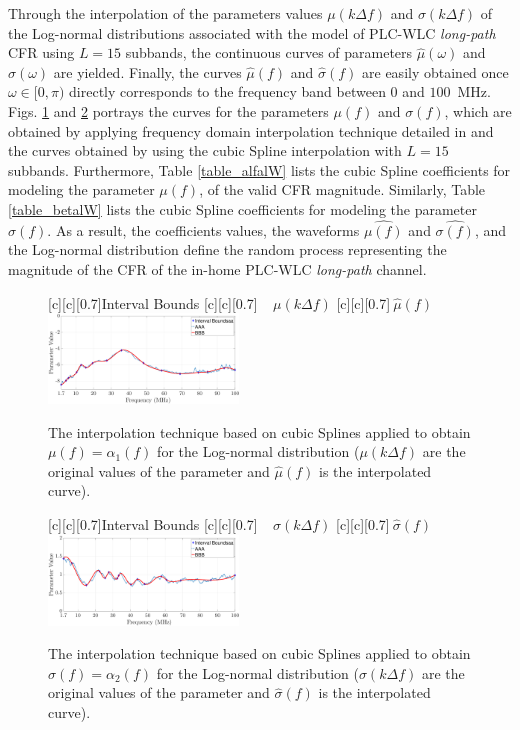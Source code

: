 \documentclass[journal]{IEEEtran}
\begin{document}
Through the interpolation of the parameters values $\mu(k\Delta f)$ and $\sigma(k\Delta f)$ of the Log-normal distributions associated with the model of \ac{PLC}-\ac{WLC} \textit{long-path} \ac{CFR} using $L=15$ subbands, the continuous curves of parameters $\hat{\mu}(\omega)$ and $\hat{\sigma}(\omega)$ are yielded. Finally, the curves $\hat{\mu}(f)$ and $\hat{\sigma}(f)$ are easily obtained once $\omega \in [0,\pi)$ directly corresponds to the frequency band between $0$ and $100$~MHz. Figs. \ref{Fit_alfalW} and \ref{Fit_betalW} portrays the curves for the parameters $\mu(f)$ and $\sigma(f)$, which are obtained by applying frequency domain interpolation technique detailed in \cite{mitra} and the curves obtained by using the cubic Spline interpolation with $L=15$ subbands. Furthermore, Table \ref{table_alfalW} lists the cubic Spline coefficients for modeling the parameter $\mu(f)$, of the valid \ac{CFR} magnitude. Similarly, Table \ref{table_betalW} lists the cubic Spline coefficients for modeling the parameter $\sigma(f)$. As a result, the coefficients values, the waveforms  $\hat{\mu(f)}$ and $\hat{\sigma(f)}$, and the Log-normal distribution define the random process representing the magnitude of the \ac{CFR} of the in-home \ac{PLC}-\ac{WLC} \textit{long-path} channel.

\begin{figure}[h]
	\centering
	[c][0.7]{Interval Bounds}
	[c][0.7]{$~~~~~\mu(k \Delta f)$}
	[c][0.7]{$~\hat{\mu}(f)$}
	\includegraphics[width=0.45\textwidth]{images/Alfa_fitlW.eps}
	\caption{The interpolation technique based on cubic Splines applied to obtain $\mu(f)=\alpha_1(f)$ for the Log-normal distribution (${\mu}(k \Delta f)$ are the original values of the parameter and $\hat{\mu}(f)$ is the interpolated curve).}
	\label{Fit_alfalW}
\end{figure}

\begin{figure}[h]
	\centering
	[c][0.7]{Interval Bounds}
	[c][0.7]{$~~~~~{\sigma}(k \Delta f)$}
	[c][0.7]{$~\hat{\sigma}(f)$}
	\includegraphics[width=0.45\textwidth]{images/Beta_fitlW.eps}
	\caption{The interpolation technique based on cubic Splines applied to obtain $\sigma(f)=\alpha_2(f)$ for the Log-normal distribution (${\sigma}(k \Delta f)$ are the original values of the parameter and $\hat{\sigma}(f)$ is the interpolated curve).}
	\label{Fit_betalW}
\end{figure}
\end{document}
